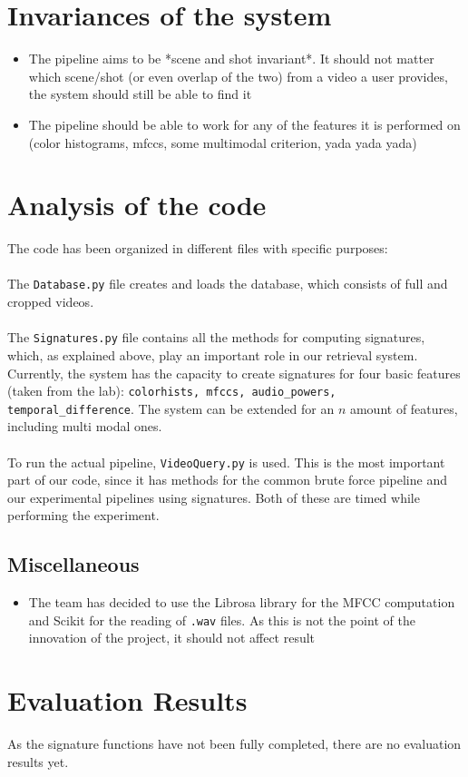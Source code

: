 \documentclass{article}
\begin{document}
\section*{Invariances of the system}
\begin{itemize}
    \item The pipeline aims to be *scene and shot invariant*. It should not matter which scene/shot (or even overlap of the two) from a video a user provides, the system should still be able to find it
    \item The pipeline should be able to work for any of the features it is performed on (color histograms, mfccs, some multimodal criterion, yada yada yada)
\end{itemize}


\section*{Analysis of the code}
The code has been organized in different files with specific purposes: \\ \\
The \texttt{Database.py} file creates and loads the database, which consists of full and cropped videos. \\
\\The \texttt{Signatures.py} file contains all the methods for computing signatures, which, as explained above, play an important role in our retrieval system. Currently, the system has the capacity to create signatures for four basic features (taken from the lab): \texttt{colorhists, mfccs, audio\_powers, temporal\_difference}. The system can be extended for an $n$ amount of features, including multi modal ones.   \\
\\
To run the actual pipeline, \texttt{VideoQuery.py} is used. This is the most important part of our code, since it has methods for the common brute force pipeline and our experimental pipelines using signatures. Both of these are timed while performing the experiment.


\subsection*{Miscellaneous}
    \begin{itemize}
    \item The team has decided to use the Librosa library for the MFCC computation and Scikit for the reading of \texttt{.wav} files. As this is not the point of the innovation of the project, it should not affect result
    \end{itemize}

\section*{Evaluation Results}
As the signature functions have not been fully completed, there are no evaluation results yet. 
    
\end{document}
